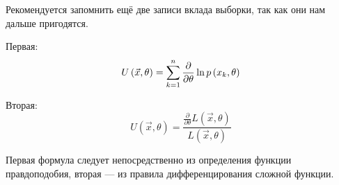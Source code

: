 \begin{remark}\label{remark:defU}
  Рекомендуется запомнить ещё две записи вклада выборки, так как они нам
  дальше пригодятся.

  Первая:
  \begin{align*}
    U\left( \vec{x},\theta \right)
    = \sum_{k=1}^n\frac{\partial}{\partial\theta}\ln{p\left(x_k,\theta\right)}
  \end{align*}

  Вторая:
  $$U\left( \vec{x},\theta \right)
    = \frac{\frac{\partial}{\partial\theta}L\left(\vec{x},\theta\right)}
      {L\left(\vec{x},\theta\right)}$$
\end{remark}
Первая формула следует непосредственно из определения функции правдоподобия,
вторая --- из правила дифференцирования сложной функции.
\begin{comment}
$$U\left( \vec{x},\theta \right)
    = \frac{\partial}{\partial\theta}\ln{L\left(\vec{x},\theta\right)}
    = \sum_{k=1}^n
      \frac{\partial}{\partial\theta}\cdot \ln{\pdf{x_k,\theta}}$$
Чтобы получить вторую запись, нужно взять производную.
Вспоминаем, как правильно дифференцировать сложные функции
\cite[с.~226]{Fichtenholz1}, \cite[с.~133]{DorogovtsevMA}
$$\frac{\partial}{\partial x} \ln{f\left( x \right)}
  = \frac{1}{f\left( x \right)}
    \cdot \frac{\partial}{\partial x} f\left( x \right)$$
И считаем
$$U\left( \vec{x},\theta \right)
  = \frac{\partial}{\partial\theta}\ln{L\left(\vec{x},\theta\right)}
  = \frac{\frac{\partial}{\partial\theta}L\left(\vec{x},\theta\right)}
    {L\left(\vec{x},\theta\right)}$$
\end{comment}

